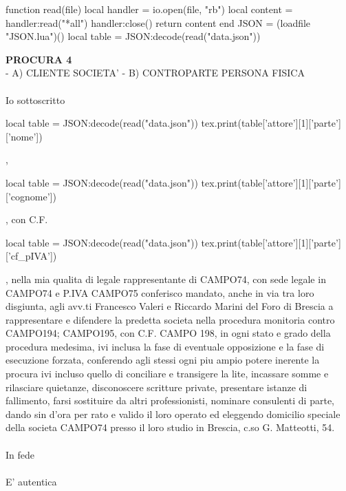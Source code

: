 \documentclass{article}
\begin{document}
\begin{luacode}

function read(file)
    local handler = io.open(file, "rb")
    local content = handler:read("*all")
    handler:close()
    return content
end
JSON = (loadfile "JSON.lua")()
local table = JSON:decode(read("data.json"))
\end{luacode}


\textbf{PROCURA 4}\\
- A) CLIENTE SOCIETA' - B) CONTROPARTE PERSONA FISICA\\
\vspace*{0.3cm}\\
Io sottoscritto 
\begin{luacode}
 local table = JSON:decode(read("data.json"))   	  
	  tex.print(table['attore'][1]['parte']['nome'])
\end{luacode}
,
\begin{luacode}
 local table = JSON:decode(read("data.json"))   	  
	  tex.print(table['attore'][1]['parte']['cognome'])
\end{luacode}
, con C.F. 
\begin{luacode}
 local table = JSON:decode(read("data.json"))   	  
	  tex.print(table['attore'][1]['parte']['cf_pIVA'])
\end{luacode}
, nella mia qualita di legale rappresentante di CAMPO74, con sede legale in CAMPO74 e P.IVA CAMPO75 conferisco mandato, anche in via tra loro disgiunta, agli avv.ti Francesco Valeri e Riccardo Marini del Foro di Brescia a rappresentare e difendere la predetta societa nella procedura monitoria contro CAMPO194; CAMPO195, con C.F. CAMPO 198, in ogni stato e grado della procedura medesima, ivi inclusa la fase di eventuale opposizione e la fase di esecuzione forzata, conferendo agli stessi ogni piu ampio potere inerente la procura ivi incluso quello di conciliare e transigere la lite, incassare somme e rilasciare quietanze, disconoscere scritture private, presentare istanze di fallimento, farsi sostituire da altri professionisti, nominare consulenti di parte, dando sin d'ora per rato e valido il loro operato ed eleggendo domicilio speciale della societa CAMPO74 presso il loro studio in Brescia, c.so G. Matteotti, 54.\\
\vspace*{0.3cm}\\
In fede\\
\vspace*{0.3cm}\\
\hspace*{12cm}E' autentica 
\end{document}
